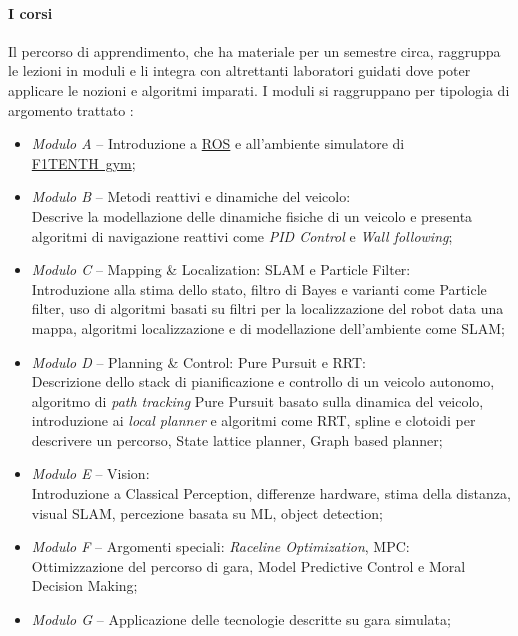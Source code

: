 \paragraph{I corsi}
Il percorso di apprendimento, che ha materiale per un semestre circa,
raggruppa le lezioni in moduli e li integra con altrettanti laboratori guidati
dove poter applicare le nozioni e algoritmi imparati.
\newpage %
\noindent I moduli si raggruppano per tipologia di argomento trattato \cite{f1learn}:
\begin{itemize}
	\item \textit{Modulo A} -- Introduzione a \hyperref[sec:ros]{ROS} e 
		all'ambiente simulatore di \hyperref[par:gym]{F1TENTH~gym};
	\item \textit{Modulo B} -- Metodi reattivi e dinamiche del veicolo: \\
	      Descrive la modellazione delle dinamiche fisiche di un veicolo e presenta algoritmi di navigazione
	      reattivi come \textit{PID Control} e \textit{Wall following};
	\item \textit{Modulo C} -- Mapping \& Localization: SLAM e Particle Filter:\\
	      Introduzione alla stima dello stato, filtro di Bayes e varianti come Particle filter, uso di
	      algoritmi basati su filtri per la localizzazione del robot data una mappa, algoritmi localizzazione e
	      di modellazione dell'ambiente come SLAM;
	\item \textit{Modulo D} -- Planning \& Control: Pure Pursuit e RRT:\\
	      Descrizione dello stack di pianificazione e controllo di un veicolo autonomo, algoritmo di
	      \textit{path tracking} Pure Pursuit basato sulla dinamica del veicolo, introduzione ai
	      \textit{local planner} e algoritmi come RRT, spline e clotoidi per descrivere un percorso,
	      State lattice planner, Graph based planner;
	\item \textit{Modulo E} -- Vision:\\
	      Introduzione a Classical Perception, differenze hardware, stima della distanza, visual SLAM,
	      percezione basata su ML, object detection;
	\item \textit{Modulo F} -- Argomenti speciali: \textit{Raceline Optimization}, MPC:\\
	      Ottimizzazione del percorso di gara, Model Predictive Control e Moral Decision Making;
	\item \textit{Modulo G} -- Applicazione delle tecnologie descritte su gara simulata;
\end{itemize}


